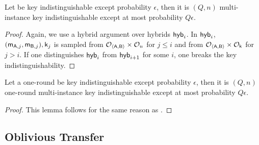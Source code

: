 \begin{lemma}\label{lem:keytomultkey}
Let \UKA be key indistinguishable except probability $\epsilon$, then it is $(Q,n)$ multi-instance key indistinguishable except at most probability $Q\epsilon$. 
\end{lemma}

\begin{proof}
Again, we use a hybrid argument over hybrids $\mathsf{hyb}_i$. In $\mathsf{hyb}_i$, $(\mathsf{m}_{\mathsf{A},j},\mathsf{m}_{\mathsf{B},j}),\mathsf{k}_j$ is sampled from $\mathcal{O}_{\langle \mathsf{A},\mathsf{B}\rangle}\times\mathcal{O}_u$ for $j\leq i$ and from $\mathcal{O}_{\langle \mathsf{A},\mathsf{B}\rangle}\times\mathcal{O}_\mathsf{k}$ for $j>i$. If one distinguishes $\mathsf{hyb}_i$ from $\mathsf{hyb}_{i+1}$ for some $i$, one breaks the key indistinguishability. 
\pe
\end{proof}

\begin{lemma}\label{lem:oneroundkeytomultkey}
Let a one-round \UKA be key indistinguishable except probability $\epsilon$, then it is $(Q,n)$ one-round multi-instance key indistinguishable except at most probability $Q\epsilon$. 
\end{lemma}

\begin{proof}
This lemma follows for the same reason as .
\pe
\end{proof}

\subsection{Oblivious Transfer}




